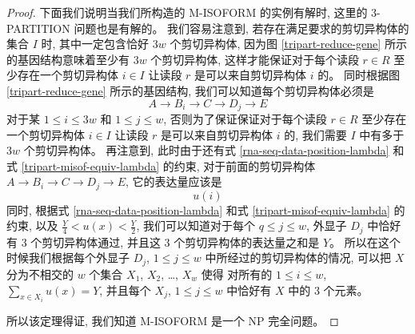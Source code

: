 \begin{proof}
下面我们说明当我们所构造的 M-ISOFORM 的实例有解时, 
这里的 3-PARTITION 问题也是有解的。 
我们容易注意到, 若存在满足要求的剪切异构体的集合 $I$ 时, 
其中一定包含恰好 $3w$ 个剪切异构体, 
因为图 \ref{tripart-reduce-gene} 所示的基因结构意味着至少有 $3w$ 个剪切异构体, 
这样才能保证对于每个读段 $r\in R$ 至少存在一个剪切异构体 $i\in I$ 
让读段 $r$ 是可以来自剪切异构体 $i$ 的。 
同时根据图 \ref{tripart-reduce-gene} 所示的基因结构, 
我们可以知道每个剪切异构体必须是
\[
A\to B_i \to C \to D_j \to E
\]
对于某 $1\leq i \leq 3w$ 和 $1 \leq j \leq w$, 
否则为了保证保证对于每个读段 $r\in R$ 至少存在一个剪切异构体 $i\in I$ 
让读段 $r$ 是可以来自剪切异构体 $i$ 的, 
我们需要 $I$ 中有多于 $3w$ 个剪切异构体。 
再注意到, 此时由于还有式 \eqref{rna-seq-data-position-lambda} 
和式 \eqref{tripart-misof-equiv-lambda} 的约束, 
对于前面的剪切异构体 $A\to B_i \to C \to D_j \to E$, 
它的表达量应该是
\[
u(i)
\]
同时, 根据式 \eqref{rna-seq-data-position-lambda} 
和式 \eqref{tripart-misof-equiv-lambda} 的约束, 
以及 $\frac{Y}{4} < u(x) < \frac{Y}{2}$, 
我们可以知道对于每个 $q\leq j\leq w$, 外显子 $D_j$ 中恰好有 3 个剪切异构体通过, 
并且这 3 个剪切异构体的表达量之和是 $Y$。 
所以在这个时候我们根据每个外显子 $D_j$, $1\leq j \leq w$ 中所经过的剪切异构体的情况, 
可以把 $X$ 分为不相交的 $w$ 个集合 $X_1$, $X_2$, \ldots, $X_w$ 使得 
对所有的 $1 \leq i \leq w$, $\sum_{x \in X_i} u(x) = Y$, 
并且每个 $X_j$, $1\leq j \leq w$ 中恰好有 $X$ 中的 3 个元素。 

所以该定理得证, 我们知道 M-ISOFORM 是一个 NP 完全问题。 

\end{proof}


